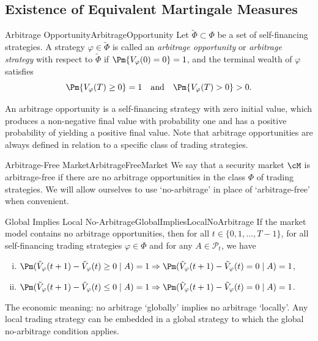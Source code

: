 \subsection{Existence of Equivalent Martingale Measures}

\begin{defn}{Arbitrage Opportunity}{ArbitrageOpportunity}
	Let $\tilde{\Phi}\subset\Phi$ be a set of self-financing strategies. A strategy $\varphi\in\tilde{\Phi}$ is called an \textit{arbitrage opportunity} or \textit{arbitrage strategy} with respect to $\tilde{\Phi}$ if $\Pm\{V_{\varphi}(0)=0\}=1$, and the terminal wealth of $\varphi$ satisfies
	\[
		\Pm\{V_{\varphi}(T)\ge 0\}=1\quad\text{and}\quad\Pm\{V_{\varphi}(T)>0\}>0.
	\]
\end{defn}

An arbitrage opportunity is a self-financing strategy with zero initial value, which produces a non-negative final value with probability one and has a positive probability of yielding a positive final value. Note that arbitrage opportunities are always defined in relation to a specific class of trading strategies.

\begin{defn}{Arbitrage-Free Market}{ArbitrageFreeMarket}
	We say that a security market $\cM$ is arbitrage-free if there are no arbitrage opportunities in the class $\Phi$ of trading strategies. We will allow ourselves to use ‘no-arbitrage’ in place of ‘arbitrage-free’ when convenient.
\end{defn}

\begin{lem}{Global Implies Local No-Arbitrage}{GlobalImpliesLocalNoArbitrage}
	If the market model contains no arbitrage opportunities, then for all $t\in\{0,1,\dots,T-1\}$, for all self-financing trading strategies $\varphi\in\Phi$ and for any $A\in\mathcal{P}_t$, we have
	\begin{enumerate}[(i)]
		\item $\Pm(\tilde{V}_{\varphi}(t+1)-\tilde{V}_{\varphi}(t)\ge 0\mid A)=1\Rightarrow \Pm(\tilde{V}_{\varphi}(t+1)-\tilde{V}_{\varphi}(t)=0\mid A)=1$,
		\item $\Pm(\tilde{V}_{\varphi}(t+1)-\tilde{V}_{\varphi}(t)\le 0\mid A)=1\Rightarrow \Pm(\tilde{V}_{\varphi}(t+1)-\tilde{V}_{\varphi}(t)=0\mid A)=1$.
	\end{enumerate}
\end{lem}

The economic meaning: no arbitrage ‘globally’ implies no arbitrage ‘locally’. Any local trading strategy can be embedded in a global strategy to which the global no-arbitrage condition applies.

